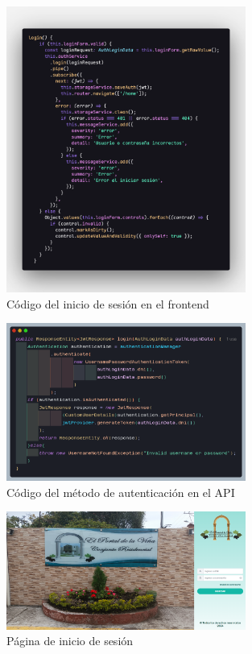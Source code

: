 \begin{figure}[H]
    \centering
    \includegraphics[width=0.7\textwidth]{resources/images/sw-login-code}
    \caption{Código del inicio de sesión en el frontend}
    \label{fig:sw-login-code}
\end{figure}

\begin{figure}[H]
    \centering
    \includegraphics[width=0.7\textwidth]{resources/images/api-auth-login-usecase}
    \caption{Código del método de autenticación en el API}
    \label{fig:api-auth-login-usecase}
\end{figure}

\begin{figure}[H]
    \centering
    \includegraphics[width=0.7\textwidth]{resources/images/sw-login}
    \caption{Página de inicio de sesión}
    \label{fig:sw-login-page}
\end{figure}

